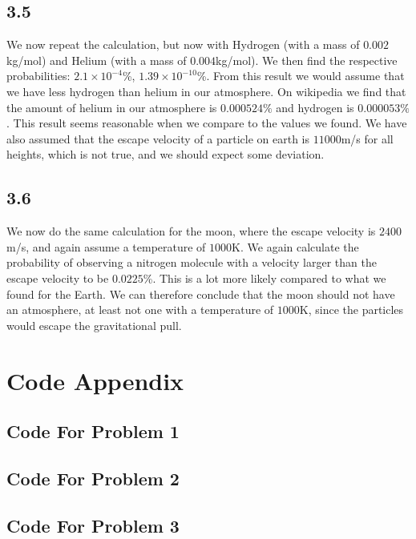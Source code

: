 \documentclass[a4paper,10pt, english]{article}
\begin{document}
\subsection*{3.5}
We now repeat the calculation, but now with Hydrogen (with a mass of $0.002$kg/mol) and Helium (with a mass of $0.004$kg/mol). We then find the respective probabilities: $2.1\times 10^{-4}$\%, $1.39\times 10^{-10}$\%. From this result we would assume that we have less hydrogen than helium in our atmosphere. On wikipedia we find that the amount of helium in our atmosphere is $0.000524\%$ and hydrogen is $0.000053\%$. This result seems reasonable when we compare to the values we found. We have also assumed that the escape velocity of a particle on earth is $11000$m/s for all heights, which is not true, and we should expect some deviation.

\subsection*{3.6}
We now do the same calculation for the moon, where the escape velocity is $2400$m/s, and again assume a temperature of $1000$K. We again calculate the probability of observing a nitrogen molecule with a velocity larger than the escape velocity to be  $0.0225$\%. This is a lot more likely compared to what we found for the Earth. We can therefore conclude that the moon should not have an atmosphere, at least not one with a temperature of $1000$K, since the particles would escape the gravitational pull.
\newpage
\section*{Code Appendix}
\subsection*{Code For Problem 1}

\subsection*{Code For Problem 2}

\subsection*{Code For Problem 3}

\end{document}
